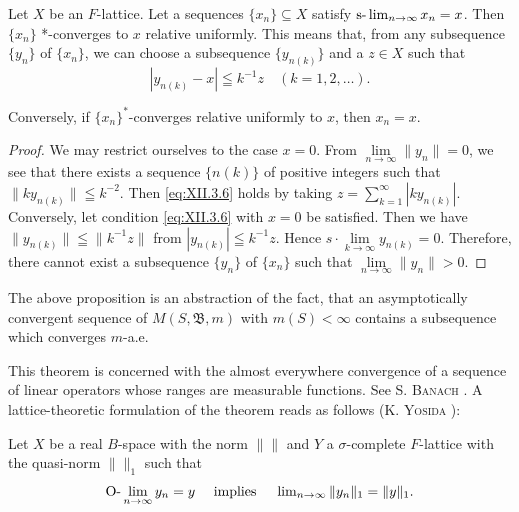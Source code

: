 \begin{proposition}\label{prop:XII.3.Proposition.2} Let $X$ be an $F$-lattice. Let a sequences $\{x_{n}\} \subseteq X$ satisfy $\text{s-}\lim\nolimits_{n \to \infty} x_{n} = x$. Then $\{x_{n}\}$ *-converges to $x$ relative uniformly. This means that, from any subsequence $\{y_{n}\}$ of $\{x_{n}\}$, we can choose a subsequence $\{y_{n(k)}\}$ and a $z \in X$ such that 
\begin{equation}\label{eq:XII.3.6}
\left| y _{n(k)} - x \right| \leqq k ^{-1} z \quad (k = 1, 2, \dots).
\end{equation}
\end{proposition}

Conversely, if $\{x_{n}\}^{*}$-converges relative uniformly to $x$, then \slim $x_{n} = x$. 

\begin{proof}
 We may restrict ourselves to the case $x = 0$. From $\lim\limits_{n \to \infty} \| y_n \| = 0$, we see that there exists a sequence $\{n(k)\}$ of positive integers such that $\| k y_{n(k)} \| \leqq k^{-2}$. Then \eqref{eq:XII.3.6} holds by taking $z = \sum\limits_{k=1}^{\infty} |k y_{n(k)}|$. Conversely, let condition \eqref{eq:XII.3.6} with $x = 0$ be satisfied. Then we have $\| y_{n(k)} \| \leqq \| k^{-1} z \|$ from $|y_{n(k)}| \leqq k^{-1} z$. Hence $s \cdot \lim\limits_{k \to \infty} y_{n(k)} = 0$. Therefore, there cannot exist a subsequence $\{y_n\}$ of $\{x_n\}$ such that $\lim\limits_{n \to \infty} \| y_n \| > 0$. 
\end{proof}

\begin{remarku} The above proposition is an abstraction of the fact, that an asymptotically convergent sequence of $M(S, \mathfrak{B}, m)$ with $m(S) < \infty$ contains a subsequence which converges $m$-a.e. 
\end{remarku}


\label{sec:XII.4}

This theorem is concerned with the almost everywhere convergence of a sequence of linear operators whose ranges are measurable functions. See S. \textsc{Banach} \cite{banach10}. A lattice-theoretic formulation of the theorem reads as follows (K. \textsc{Yosida} \cite{yosida358}): 

\begin{theoremu} Let $X$ be a real $B$-space with the norm $\|\|$ and $Y$ a $\sigma$-complete $F$-lattice with the quasi-norm $\|\|_1$ such that 
\begin{equation}\label{eq:XII.4.1}
\text{O-}\lim _{n \to \infty} y _{n} = y \quad \text{ implies } \quad \lim\nolimits _{n \to \infty} \| y _{n} \| _{1} = \| y \| _{1}.
\end{equation}
\end{theoremu}

